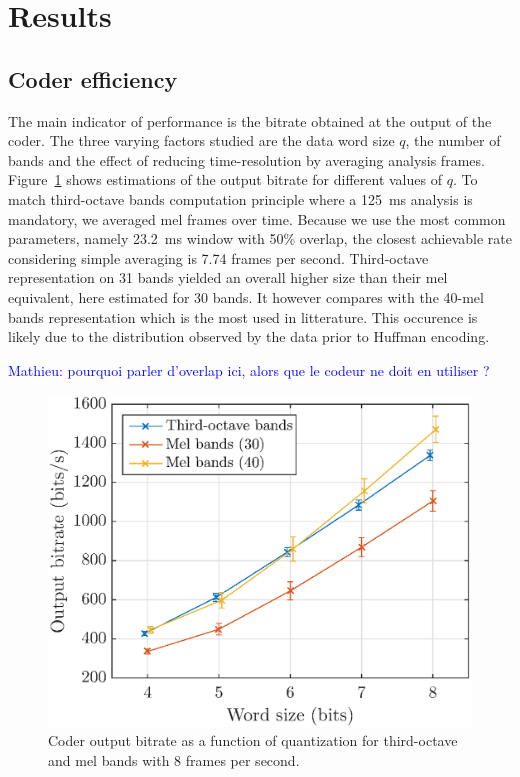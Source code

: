 \documentclass[final,3p,times,twocolumn]{elsarticle}
\newcommand{\ml}[1]{\textcolor{blue}{ Mathieu: #1}}
\begin{document}
\section{Results}

\subsection{Coder efficiency}

The main indicator of performance is the bitrate obtained at the output of the coder. The three varying factors studied are the data word size $q$, the number of bands and the effect of reducing time-resolution by averaging analysis frames. Figure~\ref{fig:bitrate_q} shows estimations of the output bitrate for different values of $q$. To match third-octave bands computation principle where a 125~ms analysis is mandatory, we averaged mel frames over time. Because we use the most common parameters, namely 23.2~ms window with 50\% overlap, the closest achievable rate considering simple averaging is 7.74 frames per second. Third-octave representation on 31 bands yielded an overall higher size than their mel equivalent, here estimated for 30 bands. It however compares with the 40-mel bands representation which is the most used in litterature. This occurence is likely due to the distribution observed by the data prior to Huffman encoding.

\ml{pourquoi parler d'overlap ici, alors que le codeur ne doit en utiliser ?}

\begin{figure}[htbp]
	\centering
		\includegraphics[width=\columnwidth]{bitrate_qall.eps}
	\caption{Coder output bitrate as a function of quantization for third-octave and mel bands with 8 frames per second.}
	\label{fig:bitrate_q}
\end{figure}
\end{document}

